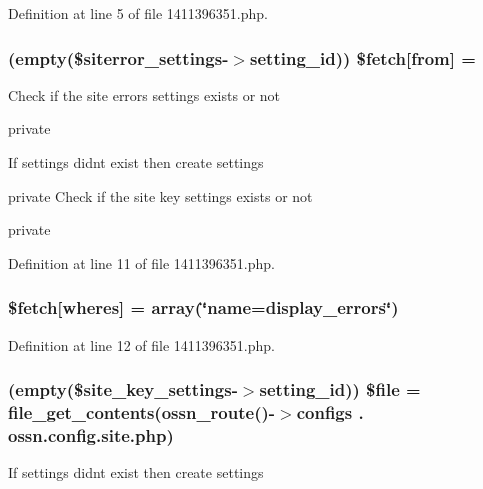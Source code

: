Definition at line 5 of file 1411396351.\+php.

\subsubsection[{\texorpdfstring{\$fetch}{$fetch}}]{ (empty(\$siterror\+\_\+settings-\/$>$setting\+\_\+id)) \$fetch\mbox{[}\textquotesingle{}from\textquotesingle{}\mbox{]} = \textquotesingle{}}\hypertarget{1411396351_8php_ae91bffdbb4c66207cfd927d922ef63e7}{}\label{1411396351_8php_ae91bffdbb4c66207cfd927d922ef63e7}
Check if the site errors settings exists or not

private

If settings didn\textquotesingle{}t exist then create settings

private Check if the site key settings exists or not

private 

Definition at line 11 of file 1411396351.\+php.

\subsubsection[{\texorpdfstring{\$fetch}{$fetch}}]{\setlength{\rightskip}{0pt plus 5cm}\$fetch\mbox{[}\textquotesingle{}wheres\textquotesingle{}\mbox{]} = array(\char`\"{}name=\textquotesingle{}display\+\_\+errors\textquotesingle{}\char`\"{})}\hypertarget{1411396351_8php_ac72c925d8ad9ab6b9bf7c7a1401230bb}{}\label{1411396351_8php_ac72c925d8ad9ab6b9bf7c7a1401230bb}


Definition at line 12 of file 1411396351.\+php.

\subsubsection[{\texorpdfstring{\$file}{$file}}]{ (empty(\$site\+\_\+key\+\_\+settings-\/$>$setting\+\_\+id)) \$file = file\+\_\+get\+\_\+contents({\bf ossn\+\_\+route}()-\/$>$configs . \textquotesingle{}ossn.\+config.\+site.\+php\textquotesingle{})}\hypertarget{1411396351_8php_a26b660feab4650f67453790d8da963ce}{}\label{1411396351_8php_a26b660feab4650f67453790d8da963ce}
If settings didn\textquotesingle{}t exist then create settings

